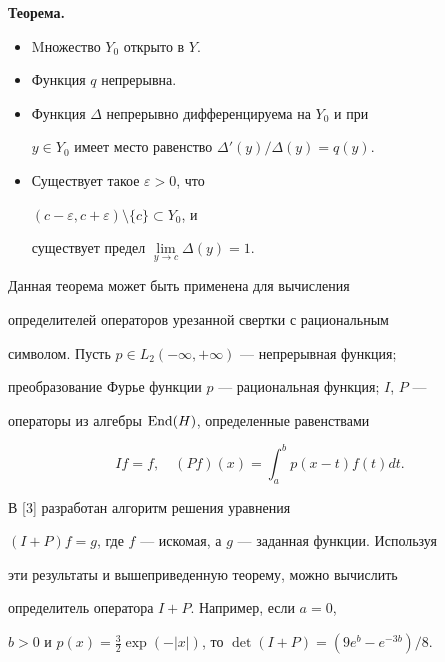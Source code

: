  


{\bf Теорема.} {\it  


\begin{itemize} 


\item[а)] Mножество $Y_0$ открыто в $Y$. 


\item[б)] Функция $q$ непрерывна. 


\item[в)] Функция $\Delta$ непрерывно дифференцируема на $Y_0$ и при 


$y\in Y_0$ имеет место равенство $\Delta'(y)/\Delta(y)=q(y)$. 


\item[г)] Существует такое $\varepsilon>0$, что 


$(c-\varepsilon,c+\varepsilon)\setminus\{c\}\subset Y_0$, и 


существует предел $\lim\limits_{y\to c}\Delta(y)=1$. 


\end{itemize} 


} 


\medskip 


 


Данная теорема может быть применена для вычисления 


определителей операторов урезанной свертки с рациональным 


символом. Пусть $p\in L_2(-\infty,+\infty)$ --- непрерывная функция; 


преобразование Фурье функции $p$ --- рациональная функция; $I$, $P$ --- 


операторы из алгебры $\operatorname{End}(H)$, определенные равенствами 


$$ 


I f=f,\quad (P f)(x)=\int^b_a p(x-t)f(t)dt. 


$$ 


 


В [3] разработан алгоритм решения уравнения 


$(I+P)f=g$, где $f$ --- искомая, а $g$ --- заданная функции. Используя 


эти результаты и вышеприведенную теорему, можно вычислить 


определитель оператора $I+P$. Например, если $a=0$, 


$b>0$ и $p(x)=\frac{3}{2}\exp(-|x|)$, то $\det(I+P)=(9e^b-e^{-3b})/8$. 


